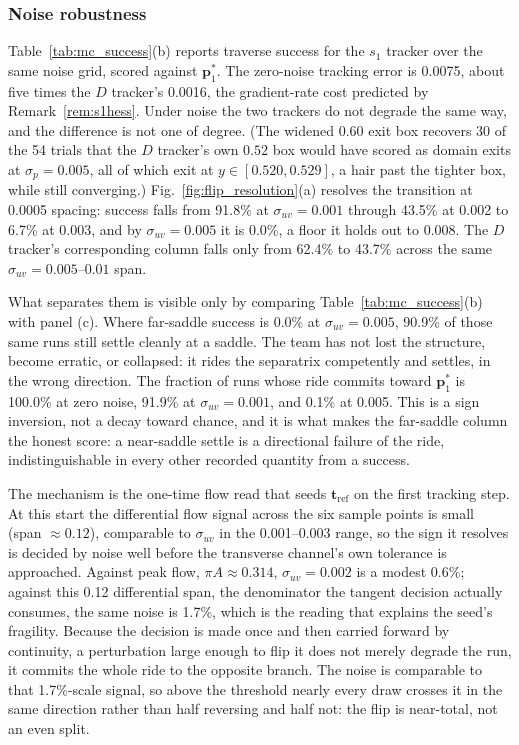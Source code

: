 \documentclass[lettersize,journal]{IEEEtran}
\begin{document}
\subsubsection{Noise robustness}
Table~\ref{tab:mc_success}(b) reports traverse success for the $s_1$
tracker over the same noise grid, scored against $\mathbf{p}^*_1$. The
zero-noise tracking error is 0.0075, about five times the $D$ tracker's
0.0016, the gradient-rate cost predicted by Remark~\ref{rem:s1hess}.
Under noise the two trackers do not degrade the same way, and the
difference is not one of degree. (The widened $0.60$ exit box recovers
30 of the 54 trials that the $D$ tracker's own $0.52$ box would have
scored as domain exits at $\sigma_p = 0.005$, all of which exit at $y
\in [0.520, 0.529]$, a hair past the tighter box, while still
converging.) Fig.~\ref{fig:flip_resolution}(a)
resolves the transition at 0.0005 spacing: success falls from 91.8\% at
$\sigma_{uv} = 0.001$ through 43.5\% at 0.002 to 6.7\% at 0.003, and by
$\sigma_{uv} = 0.005$ it is 0.0\%, a floor it holds out to 0.008. The
$D$ tracker's corresponding column falls only from 62.4\% to 43.7\%
across the same $\sigma_{uv} = 0.005$--$0.01$ span.

What separates them is visible only by comparing
Table~\ref{tab:mc_success}(b) with panel (c). Where far-saddle success
is 0.0\% at $\sigma_{uv} = 0.005$, 90.9\% of those same runs still
settle cleanly at a saddle. The team has not lost the structure, become
erratic, or collapsed: it rides the separatrix competently and settles,
in the wrong direction. The fraction of runs whose ride commits toward
$\mathbf{p}^*_1$ is 100.0\% at zero noise, 91.9\% at
$\sigma_{uv} = 0.001$, and 0.1\% at 0.005. This is a sign inversion,
not a decay toward chance, and it is what makes the far-saddle column
the honest score: a near-saddle settle is a directional failure of the
ride, indistinguishable in every other recorded quantity from a
success.

The mechanism is the one-time flow read that seeds
$\mathbf{t}_{\text{ref}}$
on the first tracking step. At this start the differential flow signal
across the six sample points is small (span $\approx 0.12$), comparable
to $\sigma_{uv}$ in the 0.001--0.003 range, so the sign it resolves is
decided by noise well before the transverse channel's own tolerance is
approached. Against peak flow, $\pi A \approx 0.314$, $\sigma_{uv} =
0.002$ is a modest 0.6\%; against this 0.12 differential span, the
denominator the tangent decision actually consumes, the same noise is
1.7\%, which is the reading that explains the seed's fragility. Because
the decision is made once and then carried forward by continuity, a
perturbation large enough to flip it does not merely degrade the run, it
commits the whole ride to the opposite branch. The noise is comparable
to that 1.7\%-scale signal, so above the threshold nearly every draw
crosses it in the same direction rather than half reversing and half
not: the flip is near-total, not an even split.
\end{document}
